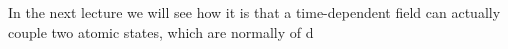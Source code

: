 In the next lecture we will see how it is that a time-dependent field can actually couple two atomic states, which are normally of  d